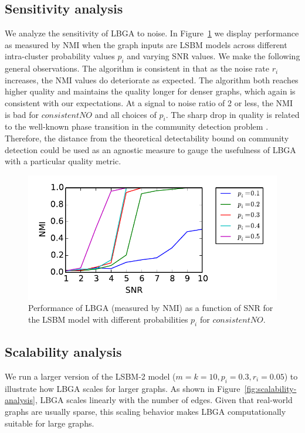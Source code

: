 \documentclass{IEEEtran}
\begin{document}
\subsection{Sensitivity analysis} \label{sec:sensitivity-analysis} We analyze
the sensitivity of LBGA to noise. In Figure~\ref{fig:sensitivity-analysis} we
display performance as measured by NMI when the graph inputs are LSBM models
across different intra-cluster probability values $p_i$ and varying SNR values.
We make the following general observations.  The algorithm is consistent in
that as the noise rate $r_i$ increases, the NMI values do deteriorate as
expected. The algorithm both reaches higher quality and maintains the quality
longer for denser graphs, which again is consistent with our expectations. At a
signal to noise ratio of 2 or less, the NMI is bad for $consistentNO$ and all
choices of $p_i$. The sharp drop in quality is related to the well-known  phase
transition in the community detection problem \cite{nadakuditi2012}.
Therefore, the distance from the theoretical detectability bound on community
detection could be used as an agnostic measure to gauge the usefulness of LBGA
with a particular quality metric.


\begin{figure}[bht]
\includegraphics[scale=0.7]{figures/signal-to-noise-consistentNO.pdf}
\caption{Performance of LBGA (measured by NMI) as a function of SNR for the
LSBM model with different probabilities $p_i$ for $consistentNO$.} 
\label{fig:sensitivity-analysis}
\end{figure}

\subsection{Scalability analysis}
\label{sec:scalability-analysis}

We run a larger version of the LSBM-2 model ($m=k=10,p_i=0.3,r_i=0.05$) to
illustrate how LBGA scales for larger graphs. As shown in
Figure~\ref{fig:scalability-analysis}, LBGA scales linearly with the number of
edges. Given that real-world graphs are usually sparse, this scaling behavior
makes LBGA computationally suitable for large graphs.
\end{document}

